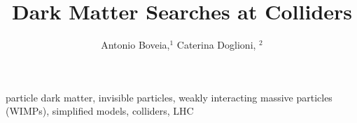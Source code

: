 \documentclass{ar-1col}
\begin{document}

\title{Dark Matter Searches at Colliders}

\newcommand{\chiDM}{\ensuremath{\chi}\xspace}
\newcommand{\IP}{invisible particle}
\newcommand{\mMed}{\ensuremath{M_{\rm{med}}}\xspace}
\newcommand{\mmed}{\mMed}
\newcommand{\gDM}{\ensuremath{g_{\chiDM}}\xspace}
\newcommand{\gdm}{\gDM}
\newcommand{\gl}{$g_{\mathrm{l}}$\xspace}
\newcommand{\gdmq}{\ensuremath{g_{\chiDM q}}\xspace}
\newcommand{\gq}{$g_{\mathrm{q}}$\xspace}
\newcommand{\mdm}{\ensuremath{m_{\chiDM}}\xspace}
\newcommand{\mDM}{\mdm}
\newcommand{\ghZprimeZprime}{\ensuremath{g_{hZ'Z'}}\xspace}
\newcommand{\gZPrime}{\ensuremath{g_{Z'}}\xspace}
\newcommand{\gZprime}{\ensuremath{g_{Z'}}\xspace}
\newcommand{\sinthetab}{\ensuremath{sin(\theta_B}\xspace}
\newcommand{\sinthetahS}{\ensuremath{sin(\theta_{hS})}\xspace}
\newcommand{\pt}{\ensuremath{p_\mathrm{T}}\xspace}
\newcommand{\pT}{\ensuremath{p_\mathrm{T}}\xspace}
\newcommand{\MET}{\ensuremath{\slashed{E}_T}\xspace}
\newcommand{\Zprime}{\ensuremath{\mathrm{Z}^\prime}\xspace}
\newcommand{\fb}{\ensuremath{\mathrm{fb}}\xspace}
\newcommand{\pb}{\ensuremath{\mathrm{pb}}\xspace}
\newcommand{\ifb}{\ensuremath{\mathrm{fb}^{-1}}\xspace}
\newcommand{\ipb}{\ensuremath{\mathrm{pb}^{-1}}\xspace}

\author{Antonio Boveia,$^1$ Caterina Doglioni, $^2$
}

\begin{abstract}

\end{abstract}

\begin{keywords}
particle dark matter, invisible particles, weakly interacting massive particles (WIMPs), simplified models, colliders, LHC \end{keywords}
\maketitle

\tableofcontents
\end{document}
